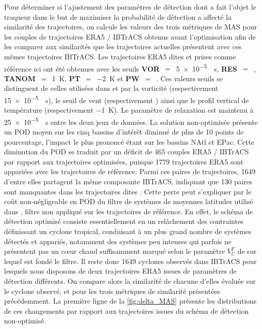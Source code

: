 \documentclass[../main.tex]{subfiles}
\begin{document}
Pour déterminer si l'ajustement des paramètres de détection dont a fait l'objet le traqueur dans le but de maximiser la probabilité de détection a affecté la
similarité des trajectoires, on calcule les valeurs des trois métriques de MAS pour les couples de trajectoires ERA5 / IBTrACS obtenus avant l'optimisation afin
de les comparer aux similarités que les trajectoires actuelles présentent avec ces mêmes trajectoires IBTrACS. Les trajectoires ERA5 dites
 et prises comme référence ici ont été obtenues avec les seuils \textbf{VOR}~$=$~\SI{5e-5}{\per\second}, \textbf{RES}~$=$~,
\textbf{TANOM}~$=$~\SI{1}{\kelvin}, \textbf{PT}~$=$~\SI{-2}{\kelvin} et \textbf{PW}~$=$~. Ces valeurs seuils se distinguent de celles utilisées dans
\textcite{dulac_assessing_2023} et \textcite{bourdin_intercomparison_2022} par la vorticité (respectivement \SI{15e-5}{\per\second}), le seuil de vent (respectivement
) ainsi que le profil vertical de température (respectivement \SI{-1}{\kelvin}). Le paramètre de relaxation est maintenu à \SI{25e-5}{\per\second} entre
les deux jeux de données. La solution non-optimisée présente un POD moyen sur les cinq bassins d'intérêt diminué de plus de \num{10} points de pourcentage,
l'impact le plus prononcé étant sur les bassins NAtl et EPac. Cette diminution du POD se traduit par un déficit de \num{465} couples ERA5 / IBTrACS par rapport
aux trajectoires optimisées, puisque \num{1779} trajectoires ERA5 sont appariées avec les trajectoires de référence. Parmi ces paires de trajectoires,
\num{1649} d'entre elles partagent la même composante IBTrACS, indiquant que \num{130} paires sont manquantes dans les trajectoires dites
. Cette perte peut s'expliquer par le coût non-négligeable en POD du filtre de systèmes de moyennes latitudes utilisé dans
\textcite{dulac_assessing_2023}, filtre non appliqué sur les trajectoires de référence. En effet, le schéma de détection optimisé consiste essentiellement en un
relâchement des contraintes définissant un cyclone tropical, conduisant à un plus grand nombre de systèmes détectés et appariés, notamment des systèmes peu
intenses qui parfois ne présentent pas un cœur chaud suffisamment marqué selon le paramètre $V_U^T$ de \textcite{hart_cyclone_2003} sur lequel est fondé le filtre.
Il reste donc \num{1649} cyclones observés dans IBTrACS pour lesquels nous disposons de deux trajectoires ERA5 issues de paramètres de détection différents.
On compare alors la similarité de chacune d'elles évaluée sur le cyclone observé, et pour les trois métriques de similarité présentées précédemment. La première
ligne de la \cref{fig:delta_MAS} présente les distributions de ces changements par rapport aux trajectoires issues du schéma de détection non-optimisé.
\end{document}
